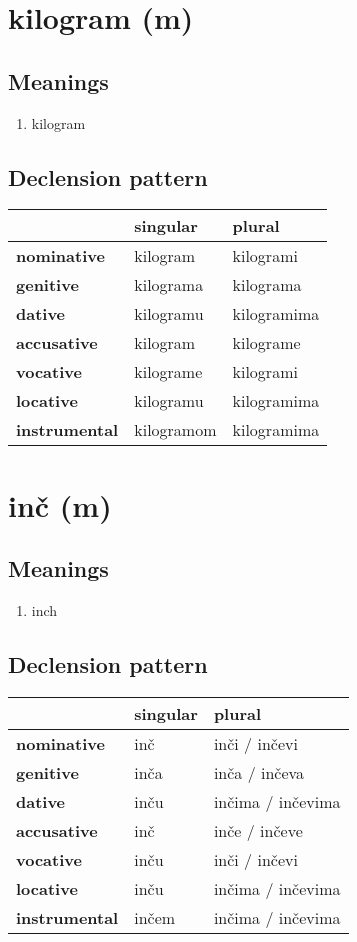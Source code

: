 \filbreak
\section{kilogram (m)}
\subsection*{Meanings}
\begin{enumerate}
\item kilogram
\end{enumerate}
\subsection*{Declension pattern}
\begin{tabularx}{\linewidth}{Xll}
\toprule
{} &    singular &       plural \\
\midrule
\textbf{nominative  } &    kilogram &    kilogrami \\
\textbf{genitive    } &   kilograma &    kilograma \\
\textbf{dative      } &   kilogramu &  kilogramima \\
\textbf{accusative  } &    kilogram &    kilograme \\
\textbf{vocative    } &   kilograme &    kilogrami \\
\textbf{locative    } &   kilogramu &  kilogramima \\
\textbf{instrumental} &  kilogramom &  kilogramima \\
\bottomrule
\end{tabularx}

\filbreak
\section{inč (m)}
\subsection*{Meanings}
\begin{enumerate}
\item inch
\end{enumerate}
\subsection*{Declension pattern}
\begin{tabularx}{\linewidth}{Xll}
\toprule
{} & singular &             plural \\
\midrule
\textbf{nominative  } &      inč &      inči / inčevi \\
\textbf{genitive    } &     inča &      inča / inčeva \\
\textbf{dative      } &     inču &  inčima / inčevima \\
\textbf{accusative  } &      inč &      inče / inčeve \\
\textbf{vocative    } &     inču &      inči / inčevi \\
\textbf{locative    } &     inču &  inčima / inčevima \\
\textbf{instrumental} &    inčem &  inčima / inčevima \\
\bottomrule
\end{tabularx}

